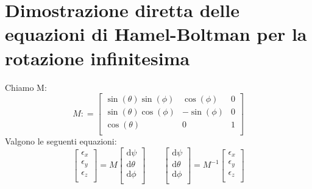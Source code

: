 \documentclass[11pt]{report}
\theoremstyle{plain}
\theoremstyle{definition}
\theoremstyle{remark}
\begin{document}
\section{Dimostrazione diretta delle equazioni di Hamel-Boltman per la rotazione infinitesima}
Chiamo M:
\begin{displaymath}
M : = \left[ \begin{array}{ccc}
\sin(\theta) \sin(\phi) & \cos(\phi)	 & 0  \\
\sin(\theta) \cos(\phi) & -\sin(\phi)	 & 0 \\
\cos(\theta) 			& 0				 & 1 \\
\end{array} \right]
\end{displaymath}
Valgono le seguenti equazioni:
\begin{displaymath}
\left[ \begin{array}{c} \epsilon _{x} \\ \epsilon _{y} \\ \epsilon _{z} \\ \end{array} \right] 
= M 
\left[ \begin{array}{c}
\textrm{d} \psi \\
\textrm{d} \theta \\
\textrm{d} \phi \\
\end{array} \right]
\qquad
\left[ \begin{array}{c}
\textrm{d} \psi \\
\textrm{d} \theta \\
\textrm{d} \phi \\
\end{array} \right] = M^{-1}
\left[ \begin{array}{c}
\epsilon _{x} \\
\epsilon _{y} \\
\epsilon _{z} \\
\end{array} \right] 
\end{displaymath}
\end{document}
